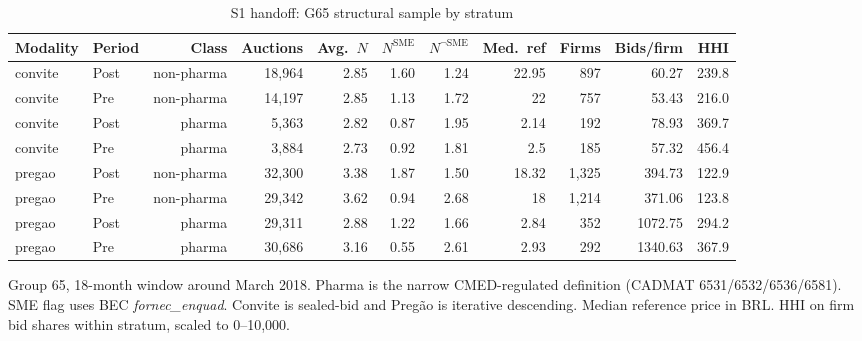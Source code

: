 \begin{table}[htbp]
\centering
\begin{threeparttable}
\caption{S1 handoff: G65 structural sample by stratum}
\label{tab:v3_s1_handoff}
\scriptsize
\setlength{\tabcolsep}{3pt}
\begin{tabular}{llrrrrrrrrr}
\toprule
Modality & Period & Class & Auctions & Avg.\ $N$ & $N^{\text{SME}}$ & $N^{\neg\text{SME}}$ & Med.\ ref & Firms & Bids/firm & HHI \\
\midrule
convite & Post & non-pharma & 18,964 & 2.85 & 1.60 & 1.24 & 22.95 & 897 & 60.27 & 239.8 \\
convite & Pre & non-pharma & 14,197 & 2.85 & 1.13 & 1.72 & 22 & 757 & 53.43 & 216.0 \\
convite & Post & pharma & 5,363 & 2.82 & 0.87 & 1.95 & 2.14 & 192 & 78.93 & 369.7 \\
convite & Pre & pharma & 3,884 & 2.73 & 0.92 & 1.81 & 2.5 & 185 & 57.32 & 456.4 \\
pregao & Post & non-pharma & 32,300 & 3.38 & 1.87 & 1.50 & 18.32 & 1,325 & 394.73 & 122.9 \\
pregao & Pre & non-pharma & 29,342 & 3.62 & 0.94 & 2.68 & 18 & 1,214 & 371.06 & 123.8 \\
pregao & Post & pharma & 29,311 & 2.88 & 1.22 & 1.66 & 2.84 & 352 & 1072.75 & 294.2 \\
pregao & Pre & pharma & 30,686 & 3.16 & 0.55 & 2.61 & 2.93 & 292 & 1340.63 & 367.9 \\
\bottomrule
\end{tabular}
\begin{tablenotes}\footnotesize
\item Group 65, 18-month window around March 2018. Pharma is the
narrow CMED-regulated definition (CADMAT 6531/6532/6536/6581).
SME flag uses BEC \emph{fornec\_enquad}. Convite is sealed-bid and
Preg\~ao is iterative descending. Median reference price in BRL.
HHI on firm bid shares within stratum, scaled to 0--10{,}000.
\end{tablenotes}
\end{threeparttable}
\end{table}
